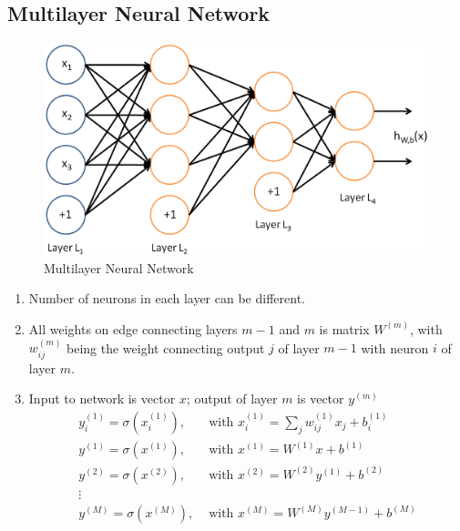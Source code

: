 \documentclass[11pt,a4paper]{article}
\begin{document}
\subsection{Multilayer Neural Network}
\begin{center}\begin{figure}[htbp]
    \centering
    \includegraphics[scale=0.2]{MNN.png}
    \caption{Multilayer Neural Network}
    \label{}
\end{figure}\end{center}
\begin{enumerate}[$\bullet$]
    \item Number of neurons in each layer can be different.
    \item All weights on edge connecting layers $m-1$ and $m$ is matrix $W^{(m)}$, with $w_{ij}^{(m)}$ being the weight connecting output $j$ of layer $m-1$ with neuron $i$ of layer $m$.
    \item Input to network is vector $x$; output of layer $m$ is vector $y^{(m)}$
    \begin{equation}
        \begin{aligned}
            y_i^{(1)}=\sigma(x_i^{(1)}),&\text{ with }x_i^{(1)}=\sum_jw_{ij}^{(1)}x_j+b_i^{(1)}\\
            y^{(1)}=\sigma(x^{(1)}),&\text{ with }x^{(1)}=W^{(1)}x+b^{(1)}\\
            y^{(2)}=\sigma(x^{(2)}),&\text{ with }x^{(2)}=W^{(2)}y^{(1)}+b^{(2)}\\
            \vdots&\\
            y^{(M)}=\sigma(x^{(M)}),&\text{ with }x^{(M)}=W^{(M)}y^{(M-1)}+b^{(M)}\\
        \end{aligned}
        \nonumber
    \end{equation}
\end{enumerate}
\end{document}

